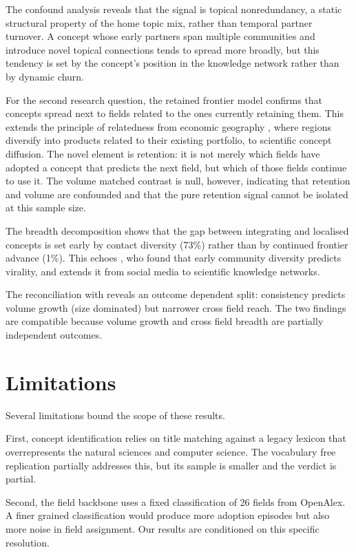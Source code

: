 \documentclass[11pt,letterpaper]{article}
\begin{document}
The confound analysis reveals that the signal is topical nonredundancy, a
static structural property of the home topic mix, rather than temporal partner
turnover. A concept whose early partners span multiple communities and introduce
novel topical connections tends to spread more broadly, but this tendency is set
by the concept's position in the knowledge network rather than by dynamic churn.

For the second research question, the retained frontier model confirms that concepts spread next to
fields related to the ones currently retaining them. This extends the principle
of relatedness from economic geography \citep{Hidalgo2007, Neffke2011}, where
regions diversify into products related to their existing portfolio, to
scientific concept diffusion. The novel element is retention: it is not merely
which fields have adopted a concept that predicts the next field, but which of
those fields continue to use it. The volume matched contrast is null, however,
indicating that retention and volume are confounded and that the pure retention
signal cannot be isolated at this sample size.

The breadth decomposition shows that the gap between integrating and localised
concepts is set early by contact diversity (73\%) rather than by continued
frontier advance (1\%). This echoes \citet{Weng2013}, who found that early
community diversity predicts virality, and extends it from social media to
scientific knowledge networks.

The reconciliation with \citet{Cheng2023} reveals an outcome dependent split:
consistency predicts volume growth (size dominated) but narrower cross field
reach. The two findings are compatible because volume growth and cross field
breadth are partially independent outcomes.

\section{Limitations}
\label{sec:limitations}

Several limitations bound the scope of these results.

First, concept identification relies on title matching against a legacy lexicon
that overrepresents the natural sciences and computer science. The
vocabulary free replication partially addresses this, but its sample is smaller
and the verdict is partial.

Second, the field backbone uses a fixed classification of 26 fields from OpenAlex.
A finer grained classification would produce more adoption episodes but also
more noise in field assignment. Our results are conditioned on this specific
resolution.
\end{document}
